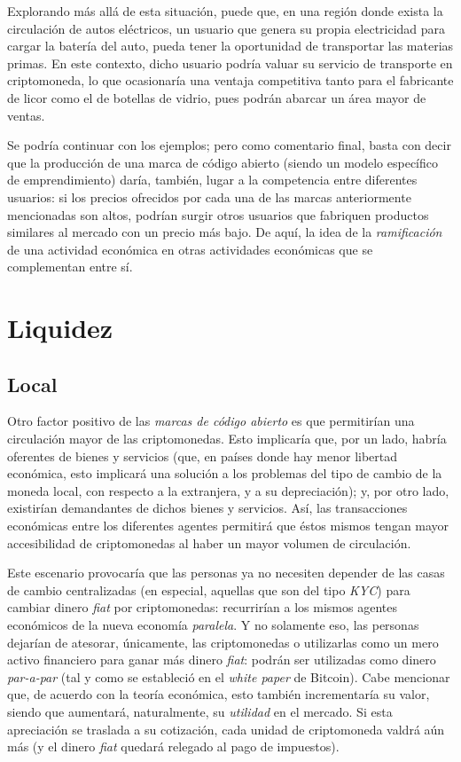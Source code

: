 \documentclass[12pt,a4paper]{article}
\begin{document}
Explorando más allá de esta situación, puede que, en una región donde exista la circulación de autos eléctricos, un usuario que genera su propia electricidad para cargar la batería del auto, pueda tener la oportunidad de transportar las materias primas. En este contexto, dicho usuario podría valuar su servicio de transporte en criptomoneda, lo que ocasionaría una ventaja competitiva tanto para el fabricante de licor como el de botellas de vidrio, pues podrán abarcar un área mayor de ventas.

Se podría continuar con los ejemplos; pero como comentario final, basta con decir que la producción de una marca de código abierto (siendo un modelo específico de emprendimiento) daría, también, lugar a la competencia entre diferentes usuarios: si los precios ofrecidos por cada una de las marcas anteriormente mencionadas son altos, podrían surgir otros usuarios que fabriquen productos similares al mercado con un precio más bajo. De aquí, la idea de la \textit{ramificación} de una actividad económica en otras actividades económicas que se complementan entre sí.

\section{Liquidez}
\subsection{Local}
Otro factor positivo de las \textit{marcas de código abierto} es que permitirían una circulación mayor de las criptomonedas. Esto implicaría que, por un lado, habría oferentes de bienes y servicios (que, en países donde hay menor libertad económica, esto implicará una solución a los problemas del tipo de cambio de la moneda local, con respecto a la extranjera, y a su depreciación); y, por otro lado, existirían demandantes de dichos bienes y servicios. Así, las transacciones económicas entre los diferentes agentes permitirá que éstos mismos tengan mayor accesibilidad de criptomonedas al haber un mayor volumen de circulación.

Este escenario provocaría que las personas ya no necesiten depender de las casas de cambio centralizadas (en especial, aquellas que son del tipo \textit{KYC}) para cambiar dinero \textit{fiat} por criptomonedas: recurrirían a los mismos agentes económicos de la nueva economía \textit{paralela}. Y no solamente eso, las personas dejarían de atesorar, únicamente, las criptomonedas o utilizarlas como un mero activo financiero para ganar más dinero \textit{fiat}: podrán ser utilizadas como dinero \textit{par-a-par} (tal y como se estableció en el \textit{white paper} de Bitcoin). Cabe mencionar que, de acuerdo con la teoría económica, esto también incrementaría su valor, siendo que aumentará, naturalmente, su \textit{utilidad} en el mercado. Si esta apreciación se traslada a su cotización, cada unidad de criptomoneda valdrá aún más (y el dinero \textit{fiat} quedará relegado al pago de impuestos).
\end{document}
